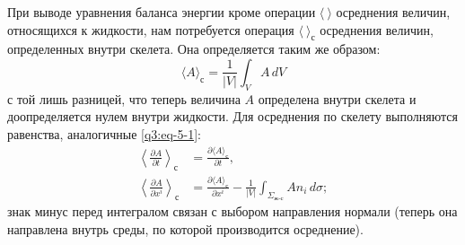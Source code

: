При выводе уравнения баланса энергии кроме операции $\langle\ \rangle$ осреднения величин, относящихся к жидкости, нам потребуется операция $\langle\ \rangle_{\text{с}}$ осреднения величин, определенных внутри скелета. Она определяется таким же образом:
\[
\langle A\rangle_{\text{с}}=\frac{1}{|V|}\int_V A\,dV
\]
с той лишь разницей, что теперь величина $A$ определена внутри скелета и доопределяется нулем внутри жидкости. Для осреднения по скелету выполняются равенства, аналогичные \eqref{q3:eq-5-1}:
\begin{equation}
\begin{aligned}
\left\langle\frac{\partial A}{\partial t}\right\rangle_{\text{с}}&=\frac{\partial\langle A\rangle_{\text{с}}}{\partial t},\\
\left\langle\frac{\partial A}{\partial x^i}\right\rangle_{\text{с}}&=\frac{\partial\langle A\rangle_{\text{с}}}{\partial x^i}-\frac{1}{|V|}\int_{\Sigma_{\text{ж-с}}}An_i\,d\sigma;
\end{aligned}
\tag{5.5}\label{q3:eq-5-5}
\end{equation}
знак минус перед интегралом связан с выбором направления нормали (теперь она направлена внутрь среды, по которой производится осреднение).

